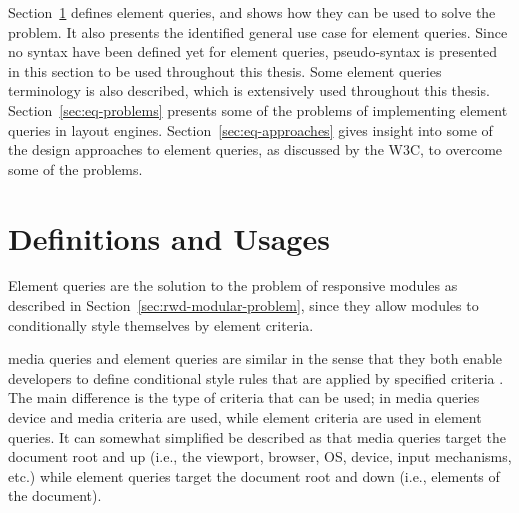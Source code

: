 \documentclass[a4paper,11pt]{kth-mag}
\begin{document}
    Section~\ref{sec:eq-definitions} defines element queries, and shows how they can be used to solve the problem.
    It also presents the identified general use case for element queries.
    Since no syntax have been defined yet for element queries, pseudo-syntax is presented in this section to be used throughout this thesis.
    Some element queries terminology is also described, which is extensively used throughout this thesis.
    Section~\ref{sec:eq-problems} presents some of the problems of implementing element queries  in \glspl{layout engine}.
    Section~\ref{sec:eq-approaches} gives insight into some of the design approaches to element queries, as discussed by the W3C, to overcome some of the problems.

    \section{Definitions and Usages}\label{sec:eq-definitions}
      \noindent
      Element queries are the solution to the problem of \gls{responsive} modules as described in Section~\ref{sec:rwd-modular-problem}, since they allow modules to conditionally style themselves by element criteria.

      \Gls{media queries} and element queries are similar in the sense that they both enable developers to define conditional style rules that are applied by specified criteria \cite{w3c_css_mq}.
      The main difference is the type of criteria that can be used; in \gls{media queries} device and media criteria are used, while element criteria are used in element queries.
      It can somewhat simplified be described as that \gls{media queries} target the \gls{document} root and up (i.e., the \gls{viewport}, \gls{browser}, OS, device, input mechanisms, etc.) while element queries target the \gls{document} root and down (i.e., \glspl{element} of the \gls{document}).
\end{document}
